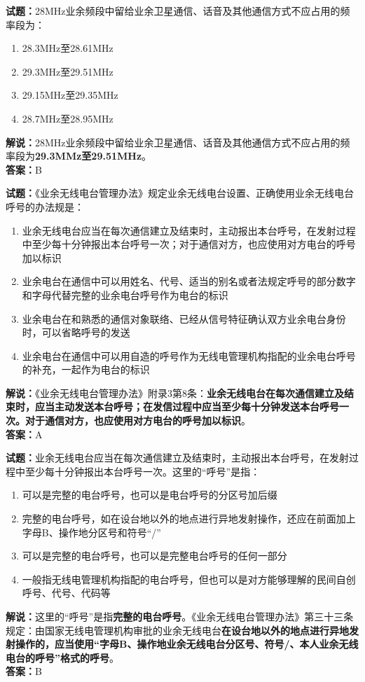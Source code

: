\documentclass{ctexbook}
\begin{document}
\bigskip

\noindent\textbf{试题：}28\unit{\MHz}业余频段中留给业余卫星通信、话音及其他通信方式不应占用的频率段为：
\begin{enumerate}[leftmargin=3em]
  \item 28.3\unit{\MHz}至28.61\unit{\MHz}
  \item 29.3\unit{\MHz}至29.51\unit{\MHz} %
  \item 29.15\unit{\MHz}至29.35\unit{\MHz}
  \item 28.7\unit{\MHz}至28.95\unit{\MHz}
\end{enumerate}
\noindent\textbf{解说：}28\unit{\MHz}业余频段中留给业余卫星通信、话音及其他通信方式不应占用的频率段为\textbf{29.3MMz至29.51\unit{\MHz}}。\\\noindent\textbf{答案：}B

\bigskip

\noindent\textbf{试题：}《业余无线电台管理办法》规定业余无线电台设置、正确使用业余无线电台呼号的办法规是：
\begin{enumerate}[leftmargin=3em]
  \item 业余无线电台应当在每次通信建立及结束时，主动报出本台呼号，在发射过程中至少每十分钟报出本台呼号一次；对于通信对方，也应使用对方电台的呼号加以标识
  \item 业余电台在通信中可以用姓名、代号、适当的别名或者法规定呼号的部分数字和字母代替完整的业余电台呼号作为电台的标识
  \item 业余电台在和熟悉的通信对象联络、已经从信号特征确认双方业余电台身份时，可以省略呼号的发送
  \item 业余电台在通信中可以用自造的呼号作为无线电管理机构指配的业余电台呼号的补充，一起作为电台的标识
\end{enumerate}
\noindent\textbf{解说：}《业余无线电台管理办法》附录3第8条：\textbf{业余无线电台在每次通信建立及结束时，应当主动发送本台呼号；在发信过程中应当至少每十分钟发送本台呼号一次。对于通信对方，也应使用对方电台的呼号加以标识}。\\\noindent\textbf{答案：}A

\bigskip

\noindent\textbf{试题：}业余无线电台应当在每次通信建立及结束时，主动报出本台呼号，在发射过程中至少每十分钟报出本台呼号一次。这里的“呼号”是指：
\begin{enumerate}[leftmargin=3em]
  \item 可以是完整的电台呼号，也可以是电台呼号的分区号加后缀
  \item 完整的电台呼号，如在设台地以外的地点进行异地发射操作，还应在前面加上字母B、操作地分区号和符号“/”
  \item 可以是完整的电台呼号，也可以是完整电台呼号的任何一部分
  \item 一般指无线电管理机构指配的电台呼号，但也可以是对方能够理解的民间自创呼号、代号、代码等
\end{enumerate}
\noindent\textbf{解说：}这里的“呼号”是指\textbf{完整的电台呼号}。《业余无线电台管理办法》第三十三条规定：由国家无线电管理机构审批的业余无线电台\textbf{在设台地以外的地点进行异地发射操作的，应当使用“字母B、操作地业余无线电台分区号、符号/、本人业余无线电台的呼号”格式的呼号}。\\\noindent\textbf{答案：}B
\end{document}
